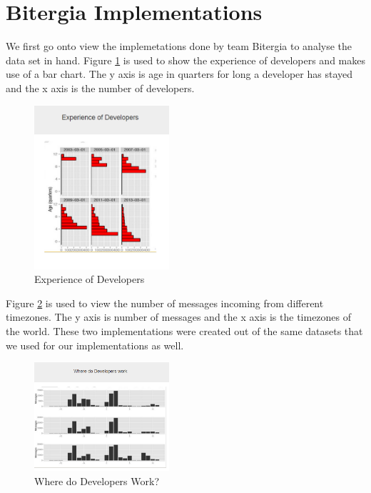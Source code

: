 \documentclass[seploa]{beavtex}
\begin{document}
\section{Bitergia Implementations}
We first go onto view the implemetations done by team Bitergia to analyse the data set in hand. Figure \ref{fig:devExp} is used to show the experience of developers and makes use of a bar chart. The y axis is age in quarters for long a developer has stayed and the x axis is the number of developers.

\begin{figure}[H]
\begin{center}
\includegraphics[width=50mm]{image11.PNG}
\end{center}
\caption{Experience of Developers}
\label{fig:devExp}
\end{figure}

Figure \ref{fig:devWork} is used to view the number of messages incoming from different timezones. The y axis is number of messages and the x axis is the timezones of the world. These two implementations were created out of the same datasets that we used for our implementations as well.

\begin{figure}[H]
\begin{center}
\includegraphics[width=50mm]{image12.PNG}
\end{center}
\caption{Where do Developers Work?}
\label{fig:devWork}
\end{figure}
\end{document}
